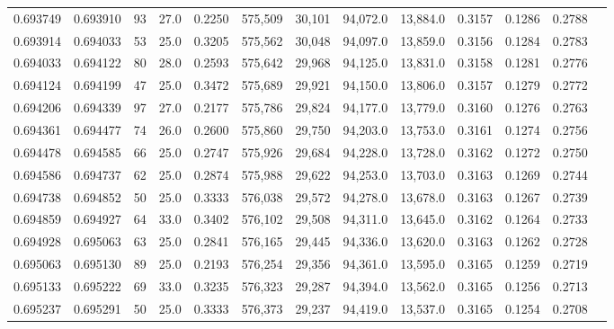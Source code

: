 \begin{tabular}{rrrrrrrrrrrrr}
0.693749 & 0.693910 &    93 & 27.0 &                                     0.2250 & 575,509 &  30,101 &  94,072.0 &  13,884.0 & 0.3157 & 0.1286 & 0.2788 \\
0.693914 & 0.694033 &    53 & 25.0 &                                     0.3205 & 575,562 &  30,048 &  94,097.0 &  13,859.0 & 0.3156 & 0.1284 & 0.2783 \\
0.694033 & 0.694122 &    80 & 28.0 &                                     0.2593 & 575,642 &  29,968 &  94,125.0 &  13,831.0 & 0.3158 & 0.1281 & 0.2776 \\
0.694124 & 0.694199 &    47 & 25.0 &                                     0.3472 & 575,689 &  29,921 &  94,150.0 &  13,806.0 & 0.3157 & 0.1279 & 0.2772 \\
0.694206 & 0.694339 &    97 & 27.0 &                                     0.2177 & 575,786 &  29,824 &  94,177.0 &  13,779.0 & 0.3160 & 0.1276 & 0.2763 \\
0.694361 & 0.694477 &    74 & 26.0 &                                     0.2600 & 575,860 &  29,750 &  94,203.0 &  13,753.0 & 0.3161 & 0.1274 & 0.2756 \\
0.694478 & 0.694585 &    66 & 25.0 &                                     0.2747 & 575,926 &  29,684 &  94,228.0 &  13,728.0 & 0.3162 & 0.1272 & 0.2750 \\
0.694586 & 0.694737 &    62 & 25.0 &                                     0.2874 & 575,988 &  29,622 &  94,253.0 &  13,703.0 & 0.3163 & 0.1269 & 0.2744 \\
0.694738 & 0.694852 &    50 & 25.0 &                                     0.3333 & 576,038 &  29,572 &  94,278.0 &  13,678.0 & 0.3163 & 0.1267 & 0.2739 \\
0.694859 & 0.694927 &    64 & 33.0 &                                     0.3402 & 576,102 &  29,508 &  94,311.0 &  13,645.0 & 0.3162 & 0.1264 & 0.2733 \\
0.694928 & 0.695063 &    63 & 25.0 &                                     0.2841 & 576,165 &  29,445 &  94,336.0 &  13,620.0 & 0.3163 & 0.1262 & 0.2728 \\
0.695063 & 0.695130 &    89 & 25.0 &                                     0.2193 & 576,254 &  29,356 &  94,361.0 &  13,595.0 & 0.3165 & 0.1259 & 0.2719 \\
0.695133 & 0.695222 &    69 & 33.0 &                                     0.3235 & 576,323 &  29,287 &  94,394.0 &  13,562.0 & 0.3165 & 0.1256 & 0.2713 \\
0.695237 & 0.695291 &    50 & 25.0 &                                     0.3333 & 576,373 &  29,237 &  94,419.0 &  13,537.0 & 0.3165 & 0.1254 & 0.2708 \\

\end{tabular}
